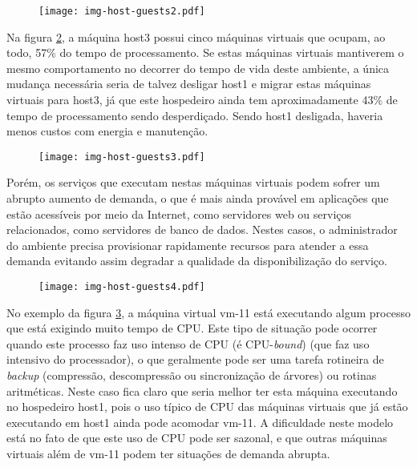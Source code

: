 \begin{figure}[htp]
\centering
\texttt{[image: img-host-guests2.pdf]}
\label{fig:hostguests2}
\end{figure}

Na figura \ref{fig:hostguests3}, a máquina host3 possui cinco máquinas
virtuais que ocupam, ao todo, 57\% do tempo de processamento. Se estas
máquinas virtuais mantiverem o mesmo comportamento no decorrer do tempo de
vida deste ambiente, a única mudança necessária seria de talvez desligar
host1 e migrar estas máquinas virtuais para host3, já que
este hospedeiro ainda tem aproximadamente 43\% de tempo de processamento
sendo desperdiçado. Sendo host1 desligada, haveria menos custos
com energia e manutenção.

\begin{figure}[htp]
\centering
\texttt{[image: img-host-guests3.pdf]}
\label{fig:hostguests3}
\end{figure}

Porém, os serviços que executam nestas máquinas virtuais podem sofrer um
abrupto aumento de demanda, o que é mais ainda provável em aplicações que
estão acessíveis por meio da Internet, como servidores web ou serviços
relacionados, como servidores de banco de dados. Nestes casos, o
administrador do ambiente precisa provisionar rapidamente recursos para
atender a essa demanda evitando assim degradar a qualidade da
disponibilização do serviço.

\begin{figure}[htp]
\centering
\texttt{[image: img-host-guests4.pdf]}
\label{fig:hostguests4}
\end{figure}

No exemplo da figura \ref{fig:hostguests4}, a máquina virtual
vm-11 está executando algum processo que está exigindo muito tempo
de CPU. Este tipo de situação pode ocorrer quando este processo faz uso intenso
de CPU (é CPU-\emph{bound}) (que faz uso intensivo do processador), o que
geralmente pode ser uma tarefa rotineira de \emph{backup} (compressão,
descompressão ou sincronização de árvores) ou rotinas aritméticas. Neste
caso fica claro que seria melhor ter esta máquina executando no hospedeiro
host1, pois o uso típico de CPU das máquinas virtuais que já estão
executando em host1 ainda pode acomodar vm-11. A dificuldade neste modelo
está no fato de que este uso de CPU pode ser sazonal, e que outras máquinas
virtuais além de vm-11 podem ter situações de demanda abrupta.

